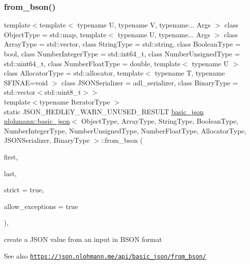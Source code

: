 \subsubsection{\texorpdfstring{from\+\_\+bson()}{from\_bson()}\hspace{0.1cm}{\footnotesize\ttfamily [2/2]}}
{\footnotesize\ttfamily template$<$template$<$ typename U, typename V, typename... Args $>$ class Object\+Type = std\+::map, template$<$ typename U, typename... Args $>$ class Array\+Type = std\+::vector, class String\+Type  = std\+::string, class Boolean\+Type  = bool, class Number\+Integer\+Type  = std\+::int64\+\_\+t, class Number\+Unsigned\+Type  = std\+::uint64\+\_\+t, class Number\+Float\+Type  = double, template$<$ typename U $>$ class Allocator\+Type = std\+::allocator, template$<$ typename T, typename S\+F\+I\+N\+A\+E=void $>$ class J\+S\+O\+N\+Serializer = adl\+\_\+serializer, class Binary\+Type  = std\+::vector$<$std\+::uint8\+\_\+t$>$$>$ \\
template$<$typename Iterator\+Type $>$ \\
static J\+S\+O\+N\+\_\+\+H\+E\+D\+L\+E\+Y\+\_\+\+W\+A\+R\+N\+\_\+\+U\+N\+U\+S\+E\+D\+\_\+\+R\+E\+S\+U\+LT \hyperlink{classnlohmann_1_1basic__json}{basic\+\_\+json} \hyperlink{classnlohmann_1_1basic__json}{nlohmann\+::basic\+\_\+json}$<$ Object\+Type, Array\+Type, String\+Type, Boolean\+Type, Number\+Integer\+Type, Number\+Unsigned\+Type, Number\+Float\+Type, Allocator\+Type, J\+S\+O\+N\+Serializer, Binary\+Type $>$\+::from\+\_\+bson (\begin{DoxyParamCaption}\item[{Iterator\+Type}]{first,  }\item[{Iterator\+Type}]{last,  }\item[{const bool}]{strict = {\ttfamily true},  }\item[{const bool}]{allow\+\_\+exceptions = {\ttfamily true} }\end{DoxyParamCaption})\hspace{0.3cm}{\ttfamily [inline]}, {\ttfamily [static]}}



create a J\+S\+ON value from an input in B\+S\+ON format 

\begin{DoxySeeAlso}{See also}
\href{https://json.nlohmann.me/api/basic_json/from_bson/}{\tt https\+://json.\+nlohmann.\+me/api/basic\+\_\+json/from\+\_\+bson/} 
\end{DoxySeeAlso}
\mbox{\label{classnlohmann_1_1basic__json_a44dd5635fb2da4710f6cd6e42b72773f}} 
